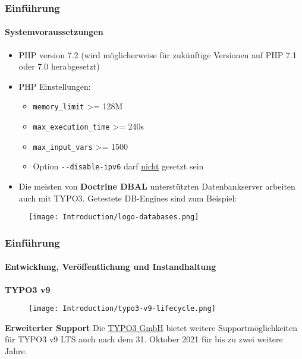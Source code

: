 \begin{frame}[fragile]
	\frametitle{Einführung}
	\framesubtitle{Systemvoraussetzungen}

	\begin{itemize}
		\item PHP version 7.2\newline
			\smaller
				(wird möglicherweise für zukünftige Versionen auf PHP 7.1 oder 7.0 herabgesetzt)
			\normalsize

		\item PHP Einstellungen:

			\begin{itemize}
				\item \texttt{memory\_limit} >= 128M
				\item \texttt{max\_execution\_time} >= 240s
				\item \texttt{max\_input\_vars} >= 1500
				\item Option \texttt{-}\texttt{-disable-ipv6} darf \underline{nicht} gesetzt sein
			\end{itemize}

		\item Die meisten von \textbf{Doctrine DBAL} unterstützten Datenbankserver arbeiten auch mit TYPO3.
			Getestete DB-Engines sind zum Beispiel:
	\end{itemize}

	\begin{figure}
		\texttt{[image: Introduction/logo-databases.png]}
	\end{figure}

\end{frame}

\begin{frame}[fragile]
	\frametitle{Einführung}
	\framesubtitle{Entwicklung, Veröffentlichung und Instandhaltung}

	\textbf{TYPO3 v9}

	\begin{figure}
		\texttt{[image: Introduction/typo3-v9-lifecycle.png]}
	\end{figure}

	\textbf{Erweiterter Support}\newline
	\smaller
		Die \href{https://typo3.com}{TYPO3 GmbH} bietet weitere Supportmöglichkeiten
		für TYPO3 v9 LTS auch nach dem 31. Oktober 2021 für bis zu zwei weitere Jahre.
	\normalsize


\end{frame}

